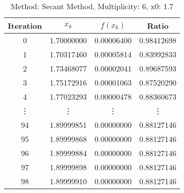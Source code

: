 \begin{table}
\centering
\caption{Method: Secant Method, Multiplicity: 6, x0: 1.7}
\label{tab:table_Secant_Method_6_1_7}
\begin{tabular}{c c c c}
\toprule
Iteration &      $x_k$ &   $f(x_k)$ &      Ratio \\
\midrule
        0 & 1.70000000 & 0.00006400 & 0.98412698 \\
        1 & 1.70317460 & 0.00005814 & 0.83992833 \\
        2 & 1.73468077 & 0.00002041 & 0.89687593 \\
        3 & 1.75172916 & 0.00001063 & 0.87520290 \\
        4 & 1.77023293 & 0.00000478 & 0.88360673 \\
   \vdots &     \vdots &     \vdots &     \vdots \\
       94 & 1.89999851 & 0.00000000 & 0.88127146 \\
       95 & 1.89999868 & 0.00000000 & 0.88127146 \\
       96 & 1.89999884 & 0.00000000 & 0.88127146 \\
       97 & 1.89999898 & 0.00000000 & 0.88127146 \\
       98 & 1.89999910 & 0.00000000 & 0.88127146 \\
\bottomrule
\end{tabular}
\end{table}
